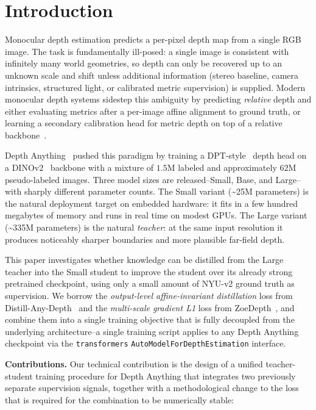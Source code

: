 \documentclass[10pt,twocolumn,letterpaper]{article}
\begin{document}
\section{Introduction}
\label{sec:intro}

Monocular depth estimation predicts a per-pixel depth map from a single
RGB image. The task is fundamentally ill-posed: a single image is
consistent with infinitely many world geometries, so depth can only be
recovered up to an unknown scale and shift unless additional information
(stereo baseline, camera intrinsics, structured light, or calibrated metric
supervision) is supplied. Modern monocular depth systems sidestep this
ambiguity by predicting \emph{relative} depth and either evaluating
metrics after a per-image affine alignment to ground truth, or learning a
secondary calibration head for metric depth on top of a relative
backbone~\cite{ranftl2022midas,bhat2023zoedepth,yang2024depth,yang2024depthv2}.

Depth Anything~\cite{yang2024depth} pushed this paradigm by training a
DPT-style~\cite{ranftl2021dpt} depth head on a DINOv2~\cite{oquab2023dinov2}
backbone with a mixture of $1.5$M labeled and approximately $62$M
pseudo-labeled images. Three model sizes are released--Small, Base, and
Large--with sharply different parameter counts. The Small variant
(\textasciitilde 25M parameters) is the natural deployment target on
embedded hardware: it fits in a few hundred megabytes of memory and runs
in real time on modest GPUs. The Large variant
(\textasciitilde 335M parameters) is the natural \emph{teacher}: at the
same input resolution it produces noticeably sharper boundaries and more
plausible far-field depth.

This paper investigates whether knowledge can be distilled from the Large
teacher into the Small student to improve the student over its already
strong pretrained checkpoint, using only a small amount of NYU-v2 ground
truth as supervision. We borrow the \emph{output-level affine-invariant
distillation} loss from Distill-Any-Depth~\cite{he2025distillanydepth}
and the \emph{multi-scale gradient L1} loss from ZoeDepth~\cite{bhat2023zoedepth},
and combine them into a single training objective that is fully decoupled
from the underlying architecture--a single training script applies to any
Depth Anything checkpoint via the \texttt{transformers}
\texttt{AutoModelForDepthEstimation} interface.

\textbf{Contributions.} Our technical contribution is the design of a
unified teacher-student training procedure for Depth Anything that
integrates two previously separate supervision signals, together with
a methodological change to the loss that is required for the
combination to be numerically stable:
\end{document}
